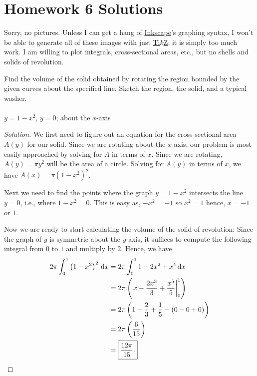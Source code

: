 \chapter{Homework 6 Solutions}
Sorry, no pictures. Unless I can get a hang of
\href{https://inkscape.org/}{Inkscape}'s graphing syntax, I won't be able
to generate all of these images with just
\href{http://www.texample.net/tikz/}{Ti$k$Z}; it is simply too much work. I
am willing to plot integrals, cross-sectional areas, etc., but no shells
and solids of revolution.

\begin{problem}
Find the volume of the solid obtained by rotating the region bounded by the
given curves about the specified line. Sketch the region, the solid, and a
typical washer.
\\\\
$y=1-x^2$, $y=0$; about the $x$-axis
\end{problem}
\begin{proof}[Solution]
  We first need to figure out an equation for the cross-sectional area
  $A(y)$ for our solid. Since we are rotating about the $x$-axis, our
  problem is most easily approached by solving for $A$ in terms of
  $x$. Since we are rotating, $A(y)=\pi y^2$ will be the area of a
  circle. Solving for $A(y)$ in terms of $x$, we have $A(x)=\pi
  (1-x^2)^2$.

  Next we need to find the points where the graph $y=1-x^2$ intersects the
  line $y=0$, i.e., where $1-x^2=0$. This is easy as, $-x^2=-1$ so $x^2=1$
  hence, $x=-1$ or $1$.

  Now we are ready to start calculating the volume of the solid of
  revolution: Since the graph of $y$ is symmetric about the $y$-axis, it
  suffices to compute the following integral from $0$ to $1$ and multiply
  by $2$. Hence, we have
  \begin{align*}
    2\pi\int_0^1\left(1-x^2\right)^2\,\mathrm{d} x
    &=2\pi\int_0^11-2x^2+x^4\,\mathrm{d} x\\
    &=2\pi\left(\left.x-\frac{2x^3}{3}+\frac{x^5}{5}\right|_0^1\right)\\
    &=2\pi\left(1-\frac{2}{3}+\frac{1}{5}-(0-0+0)\right)\\
    &=2\pi\left(\frac{6}{15}\right)\\
    &=\boxed{\frac{12\pi}{15}.}
  \end{align*}
\end{proof}

